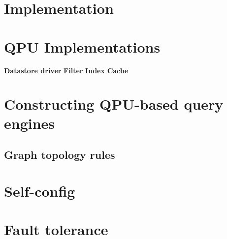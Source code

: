 \section{Implementation}


\section{QPU Implementations}
\textbf{Datastore driver}
\textbf{Filter}
\textbf{Index}
\textbf{Cache}


\section{Constructing QPU-based query engines}
\subsection{Graph topology rules}


\section{Self-config}


\section{Fault tolerance}

